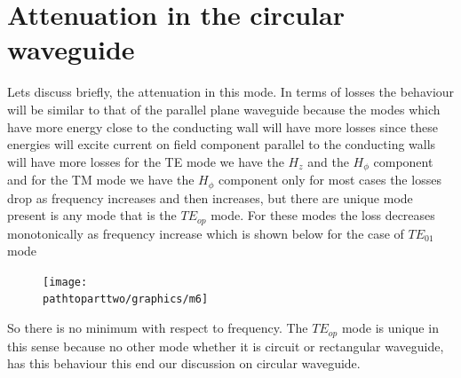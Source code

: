 \section{Attenuation in the circular waveguide}
 Lets discuss briefly, the attenuation in this mode. In terms of losses the behaviour will be similar to that of the parallel plane waveguide because the modes which have more energy close to the conducting wall will have more losses since these energies will excite current on field component parallel to the conducting walls will have more losses for the TE mode we have the $H_z$ and the $H_\phi$ component and for the TM mode we have the $H_\phi$ component only for most cases the losses drop as frequency increases and then increases, but there are unique mode present is any mode that is the $TE_{op}$ mode. For these modes the loss decreases monotonically as frequency increase which is shown below for the case of $TE_{01}$ mode 
\begin{figure}[h]
\centering
\texttt{[image: \\pathtoparttwo/graphics/m6]}
\caption{}
\label{fig:m6}
\end{figure}

So there is no minimum with respect to frequency. The $TE_{op}$ mode is unique in this sense because no other mode whether it is circuit or rectangular waveguide, has this behaviour this end our discussion on circular waveguide.